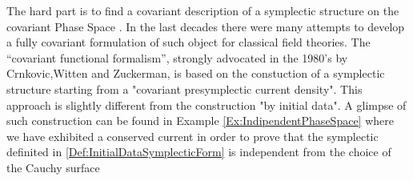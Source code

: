 \documentclass[Main]{subfiles}
\begin{document}
		The hard part is to find a covariant description of a symplectic structure on the covariant Phase Space .
		In the last decades there were many attempts to develop a fully covariant formulation of such object for classical field theories.
		The “covariant functional formalism”, strongly advocated in the 1980’s by Crnkovic,Witten and Zuckerman,
		is based on the constuction of a symplectic structure starting from a "covariant presymplectic current density"\cite{Crnkovic1999}\cite{Khavkine2014}.
		This approach is slightly different from the construction "by initial data". A glimpse of such construction can be found in Example \ref{Ex:IndipendentPhaseSpace} where we have exhibited a conserved current in order to prove that the symplectic definited in \ref{Def:InitialDataSymplecticForm} is independent from the choice of the Cauchy surface
\end{document}
